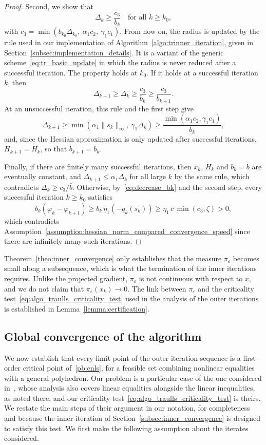 \documentclass{article}
\numberwithin{equation}{section}
\theoremstyle{plain}
\begin{document}
\begin{proof}
	Second, we show that
	\[\Delta_k \ge \frac{c_3}{b_k} \quad \text{for all } k \ge k_0,\]
	with $c_3 = \min\left(b_{k_0}\Delta_{k_0},\ \alpha_1c_2,\ \gamma_1c_1\right)$.
	From now on, the radius is updated by the rule used in our implementation of Algorithm~\ref{algo:trinner_iteration}, given in Section~\ref{subsec:implementation_details}. It is a variant of the generic scheme~\eqref{eq:tr_basic_update} in which the radius is never reduced after a successful iteration. The property holds at $k_0$. If it holds at a successful iteration $k$, then
	\[\Delta_{k+1} \ge \Delta_k \ge \frac{c_3}{b_k} \ge \frac{c_3}{b_{k+1}}.\]
	At an unsuccessful iteration, this rule and the first step give
	\[\Delta_{k+1} \ge \min\left(\alpha_1\|s_k\|_\infty,\ \gamma_1\Delta_k\right) \ge \frac{\min(\alpha_1c_2,\gamma_1c_1)}{b_k},\]
	and, since the Hessian approximation is only updated after successful iterations, $H_{k+1} = H_k$, so that $b_{k+1} = b_k$.

	Finally, if there are finitely many successful iterations, then $x_k$, $H_k$ and $b_k = \bar{b}$ are eventually constant, and $\Delta_{k+1} \le \alpha_1\Delta_k$ for all large $k$ by the same rule, which contradicts $\Delta_k \ge c_3/\bar{b}$. Otherwise, by~\eqref{eq:decrease_bk} and the second step, every successful iteration $k \ge k_0$ satisfies
	\[b_k\left(\varphi_k - \varphi_{k+1}\right) \ge b_k\,\eta_1\left(-q_k(s_k)\right) \ge \eta_1\,c\,\min(c_3,\zeta) > 0,\]
	which contradicts Assumption~\ref{assumption:hessian_norm_compared_convergence_speed} since there are infinitely many such iterations.
\end{proof}
Theorem~\ref{theo:inner_convergence} only establishes that the measure $\pi_\varepsilon$ becomes small along a subsequence, which is what the termination of the inner iterations requires. Unlike the projected gradient, $\pi_\varepsilon$ is not continuous with respect to $x$, and we do not claim that $\pi_\varepsilon(x_k) \to 0$. The link between $\pi_\varepsilon$ and the criticality test~\eqref{eq:algo_traulls_criticality_test} used in the analysis of the outer iterations is established in Lemma~\ref{lemma:certification}.

\subsection{Global convergence of the algorithm}\label{subsec:outer_convergence}

We now establish that every limit point of the outer iteration sequence is a first-order critical point of~\eqref{pb:cnls}, for a feasible set combining nonlinear equalities with a general polyhedron. Our problem is a particular case of the one considered in~\cite{conn-etal:1996b}, whose analysis also covers linear equalities alongside the linear inequalities, as noted there, and our criticality test~\eqref{eq:algo_traulls_criticality_test} is theirs. We restate the main steps of their argument in our notation, for completeness and because the inner iteration of Section~\ref{subsec:inner_convergence} is designed to satisfy this test. 
We first make the following assumption about the iterates considered.
\end{document}
